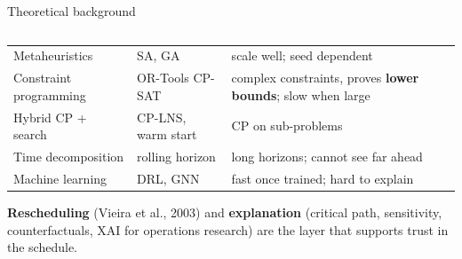 \begin{frame}{Theoretical background}
\begin{columns}[T]
\begin{column}{0.49\textwidth}
\begin{tabular}{@{}L{1.75cm}L{2.0cm}L{2.85cm}@{}}
Metaheuristics & SA, GA & scale well; seed dependent\\
Constraint programming & OR-Tools CP-SAT & complex constraints, proves \textbf{lower bounds}; slow when large\\
Hybrid CP + search & CP-LNS, warm start & CP on sub-problems\\
Time decomposition & rolling horizon & long horizons; cannot see far ahead\\
Machine learning & DRL, GNN & fast once trained; hard to explain\\
\bottomrule
\end{tabular}
\vspace{0.4em}

\textbf{Rescheduling} (Vieira et al., 2003) and \textbf{explanation} (critical path, sensitivity, counterfactuals,
XAI for operations research) are the layer that supports trust in the schedule.
\end{column}
\end{columns}
\end{frame}

